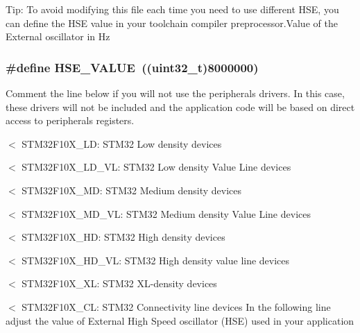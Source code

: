 Tip\-: To avoid modifying this file each time you need to use different H\-S\-E, you can define the H\-S\-E value in your toolchain compiler preprocessor.\-Value of the External oscillator in Hz \hypertarget{group___library__configuration__section_gaeafcff4f57440c60e64812dddd13e7cb}{
\subsubsection[{H\-S\-E\-\_\-\-V\-A\-L\-U\-E}]{\setlength{\rightskip}{0pt plus 5cm}\#define H\-S\-E\-\_\-\-V\-A\-L\-U\-E~((uint32\-\_\-t)8000000)}}\label{group___library__configuration__section_gaeafcff4f57440c60e64812dddd13e7cb}


Comment the line below if you will not use the peripherals drivers. In this case, these drivers will not be included and the application code will be based on direct access to peripherals registers. 

$<$ S\-T\-M32\-F10\-X\-\_\-\-L\-D\-: S\-T\-M32 Low density devices

$<$ S\-T\-M32\-F10\-X\-\_\-\-L\-D\-\_\-\-V\-L\-: S\-T\-M32 Low density Value Line devices

$<$ S\-T\-M32\-F10\-X\-\_\-\-M\-D\-: S\-T\-M32 Medium density devices

$<$ S\-T\-M32\-F10\-X\-\_\-\-M\-D\-\_\-\-V\-L\-: S\-T\-M32 Medium density Value Line devices

$<$ S\-T\-M32\-F10\-X\-\_\-\-H\-D\-: S\-T\-M32 High density devices

$<$ S\-T\-M32\-F10\-X\-\_\-\-H\-D\-\_\-\-V\-L\-: S\-T\-M32 High density value line devices

$<$ S\-T\-M32\-F10\-X\-\_\-\-X\-L\-: S\-T\-M32 X\-L-\/density devices

$<$ S\-T\-M32\-F10\-X\-\_\-\-C\-L\-: S\-T\-M32 Connectivity line devices In the following line adjust the value of External High Speed oscillator (H\-S\-E) used in your application

